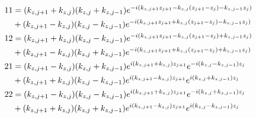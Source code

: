 \begin{align*}
	11 &= 
		\pqty{k_{z,j+1} + k_{z,j}}\pqty{k_{z,j} + k_{z,j-1}}
		e^{-i\pqty{k_{z,j+1}z_{j+1} - k_{z,j}\pqty{z_{j+1} - z_j} - k_{z,j-1}z_j}} \\
	&+
		\pqty{k_{z,j+1} - k_{z,j}}\pqty{k_{z,j} - k_{z,j-1}}
		e^{-i\pqty{k_{z,j+1}z_{j+1} + k_{z,j}\pqty{z_{j+1} - z_j} - k_{z,j-1}z_j}} \\
	12 &= 
		\pqty{k_{z,j+1} + k_{z,j}}\pqty{k_{z,j} - k_{z,j-1}}
		e^{-i\pqty{k_{z,j+1}z_{j+1} - k_{z,j}\pqty{z_{j+1} - z_j} + k_{z,j-1}z_j}} \\
	&+
		\pqty{k_{z,j+1} - k_{z,j}}\pqty{k_{z,j} + k_{z,j-1}}
		e^{-i\pqty{k_{z,j+1}z_{j+1} + k_{z,j}\pqty{z_{j+1} - z_j} + k_{z,j-1}z_j}} \\
	21 &= 
		\pqty{k_{z,j+1} - k_{z,j}}\pqty{k_{z,j} + k_{z,j-1}}e^{ i\pqty{k_{z,j+1} + k_{z,j}}z_{j+1}}e^{-i\pqty{k_{z,j} - k_{z,j-1}}z_j} \\
	&+
		\pqty{k_{z,j+1} + k_{z,j}}\pqty{k_{z,j} - k_{z,j-1}}e^{ i\pqty{k_{z,j+1} - k_{z,j}}z_{j+1}}e^{ i\pqty{k_{z,j} + k_{z,j-1}}z_j} \\
	22 &= 
		\pqty{k_{z,j+1} - k_{z,j}}\pqty{k_{z,j} - k_{z,j-1}}e^{ i\pqty{k_{z,j+1} + k_{z,j}}z_{j+1}}e^{-i\pqty{k_{z,j} + k_{z,j-1}}z_j} \\
	&+
		\pqty{k_{z,j+1} + k_{z,j}}\pqty{k_{z,j} + k_{z,j-1}}e^{ i\pqty{k_{z,j+1} - k_{z,j}}z_{j+1}}e^{ i\pqty{k_{z,j} - k_{z,j-1}}z_j}
\end{align*}










